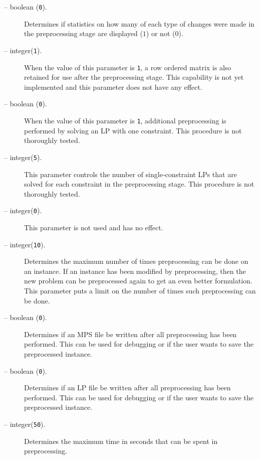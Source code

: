 \begin{description}
\item[ -- boolean ({\tt 0}).]
Determines if statistics on how many of each type of changes were made in the
preprocessing stage are displayed ($1$) or not ($0$).

\item[ -- integer({\tt 1}).]
When the value of this parameter is {\tt 1}, a row ordered matrix is also
retained for use after the preprocessing stage. This capability is not yet
implemented and this parameter does not have any effect.

\item[ -- boolean ({\tt 0}).]
When the value of this parameter is {\tt 1}, additional preprocessing is
performed by solving an LP with one constraint. This procedure is not
thoroughly tested.

\item[ -- integer({\tt 5}).]
This parameter controls the number of single-constraint LPs that are solved
for each constraint in the preprocessing stage. This procedure is not
thoroughly tested.

\item[ -- integer({\tt 0}).]
This parameter is not used and has no effect.

\item[ -- integer({\tt 10}).]
Determines the maximum number of times preprocessing can be done on an
instance. If an instance has been modified by preprocessing, then the new
problem can be preprocessed again to get an even better formulation. This
parameter puts a limit on the number of times such preprocessing can be done.

\item[ -- boolean ({\tt 0}).]
Determines if an MPS file be written after all preprocessing has been
performed. This can be used for debugging or if the user wants to save the
preprocessed instance.

\item[ -- boolean ({\tt 0}).]
Determines if an LP file be written after all preprocessing has been
performed. This can be used for debugging or if the user wants to save the
preprocessed instance.

\item[ -- integer({\tt 50}).]
Determines the maximum time in seconds that can be spent in preprocessing.


\end{description}

